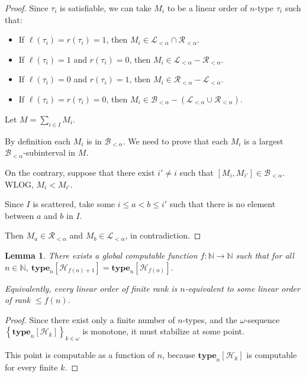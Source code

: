 \documentclass{article}
\newtheorem{lemma}{Lemma}
\newcommand{\brackets}[1]{\left[ {#1} \right]}
\newcommand{\braces}[1]{\left\{ {#1} \right\}}
\newcommand{\NN}{\mathbb{N}}
\newcommand{\type}[2]{\mathbf{type}_{#1} \brackets{#2}}
\begin{document}
\begin{proof}
  Since $\tau_i$ is satisfiable, we can take $M_i$ to be a linear order of $n$-type
  $\tau_i$ such that:

  \begin{itemize}
    \item If $\ell(\tau_i) = r(\tau_i) = 1$, then $M_i \in \mathcal{L}_{< \alpha} \cap \mathcal{R}_{< \alpha}$.
    \item If $\ell(\tau_i) = 1$ and $r(\tau_i) = 0$, then $M_i \in \mathcal{L}_{< \alpha} - \mathcal{R}_{< \alpha}$.
    \item If $\ell(\tau_i) = 0$ and $r(\tau_i) = 1$, then $M_i \in \mathcal{R}_{< \alpha} - \mathcal{L}_{< \alpha}$.
    \item If $\ell(\tau_i) = r(\tau_i) = 0$, then $M_i \in \mathcal{B}_{< \alpha} - (\mathcal{L}_{< \alpha} \cup \mathcal{R}_{< \alpha})$.
  \end{itemize}

  Let $M = \sum_{i \in I} M_i$.

  By definition each $M_i$ is in $\mathcal{B}_{< \alpha}$. We need to prove
  that each $M_i$ is a largest $\mathcal{B}_{< \alpha}$-subinterval in $M$.

  On the contrary, suppose that there exist $i' \ne i$ such that $[M_i, M_{i'}] \in \mathcal{B}_{< \alpha}$.
  WLOG, $M_i < M_{i'}$.

  Since $I$ is scattered, take some $i \le a < b \le i'$ such that
  there is no element between $a$ and $b$ in $I$.

  Then $M_a \in \mathcal{R}_{< \alpha}$ and $M_b \in \mathcal{L}_{< \alpha}$, in contradiction.
\end{proof}


\begin{lemma}
  There exists a global computable function $f : \NN \to \NN$ such that
  for all $n \in \NN$,
  $\type{n}{\mathcal{H}_{f(n) + 1}} = \type{n}{\mathcal{H}_{f(n)}}$.

  Equivalently, every linear order of finite rank is $n$-equivalent to some linear order of rank $\le f(n)$.
\end{lemma}

\begin{proof}
  Since there exist only a finite number of $n$-types,
  and the $\omega$-sequence $\braces{\type{n}{\mathcal{H}_{k}}}_{k \in \omega}$ is monotone,
  it must stabilize at some point.

  This point is computable as a function of $n$, because
  $\type{n}{\mathcal{H}_{k}}$ is computable for every finite $k$.
\end{proof}
\end{document}

